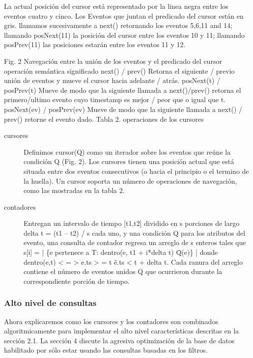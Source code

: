 \documentclass[12pt,a4paper]{report}
\begin{document}
	

	La actual posición del cursor está representado por la linea negra entre los eventos cuatro y cinco.  Los Eventos que juntan el predicado del cursor están en gris.   llamamos sucesivamente a next() retornando los eventos 5,6,11 and 14;  llamando posNext(11) la posición del cursor entre los eventos 10 y 11; llamando posPrev(11) las posiciones estarán entre los eventos 11 y 12.

Fig. 2 Navegación entre la unión de los eventos y el predicado del cursor 
operación
semántica {significado}
next() / prev()
Retorna el siguiente / previo unión de eventos y mueve el cursor hacia adelante / atrás.
posNext(t) / posPrev(t)
Mueve de modo que la siguiente llamada a next()/prev() retorna el primero/ultimo evento cuyo timestamp es mejor / peor que o igual que t.
posNext(ev) / posPrev(ev)
Mueve de modo que la siguiente llamada a next() / prev() retorne el evento dado.
Tabla 2. operaciones de los cursores

\begin{description}
	\item[cursores] Definimos cursor(Q) como un iterador sobre los eventos que reúne la condición Q (Fig. 2).  Los cursores tienen una posición actual que está situada entre dos eventos consecutivos (o hacia el principio o el termino de la huella).  Un cursor soporta un número de operaciones de navegación, como las mostradas en la tabla 2.

	\item[contadores] Entregan un intervalo de tiempo [t1,t2] dividido en s porciones de largo delta t = (t1 – t2) / s cada uno, y una condición Q para los atributos del evento, una consulta de contador regresa un arreglo de s enteros tales que s[i] = | \{e pertenece a T: dentro(e, t1 + i*delta t) \^ Q(e)\} | donde dentro(e,t) < = > e.ts > = t \^ e.ts < t + delta t.   Cada ranura del arreglo contiene el número de eventos unidos Q que ocurrieron durante la correspondiente porción de tiempo.
\end{description}

			\subsubsection{Alto nivel de consultas}

	Ahora explicaremos como los cursores y los contadores son combinados algoritmicamente para implementar el alto nivel características descritas en la sección 2.1.  La sección 4 discute la agresiva optimización de la base de datos habilitado por sólo estar usando las consultas basadas en los filtros.
\end{document}
